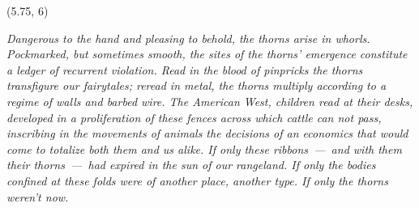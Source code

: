 \documentclass[10pt]{article}
\begin{document}
\begin{textblock}{11.5}(5.75, 6)

\textit{Dangerous to the hand and pleasing to behold, the thorns arise in
whorls. Pockmarked, but sometimes smooth, the sites of the thorns' emergence
constitute a ledger of recurrent violation. Read in the blood of pinpricks the
thorns transfigure our fairytales; reread in metal, the thorns multiply
according to a regime of walls and barbed wire. The American West, children
read at their desks, developed in a proliferation of these fences across which
cattle can not pass, inscribing in the movements of animals the decisions of an
economics that would come to totalize both them and us alike. If only these
ribbons~---~and with them their thorns~---~had expired in the sun of our
rangeland. If only the bodies confined at these folds were of another place,
another type. If only the thorns weren't now.}


\end{textblock}
\end{document}
